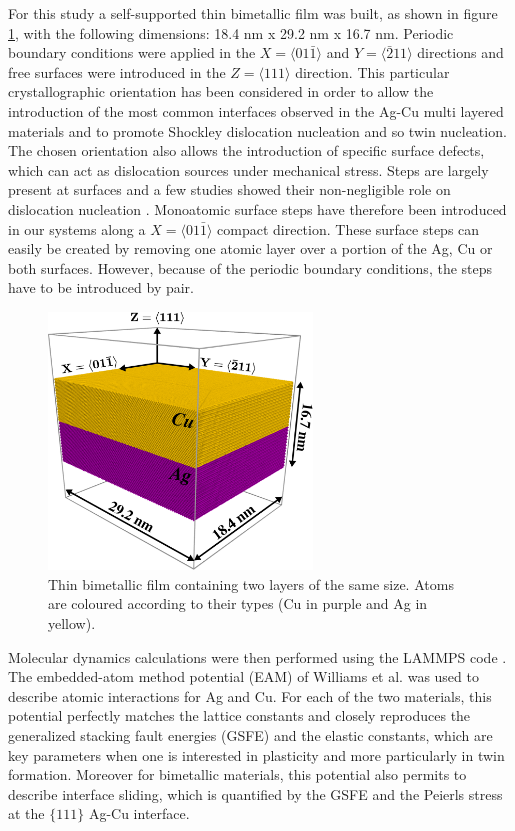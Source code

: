 \documentclass[final,3p,times,twocolumn]{elsarticle}
\begin{document}
For this study a self-supported thin bimetallic film was built, as shown in figure \ref{fig_mod_geo}, with the following dimensions: 18.4 nm x 29.2 nm x 16.7 nm. Periodic boundary conditions were applied in the $X=\langle01\bar{1}\rangle$ and $Y=\langle\bar{2}11\rangle$ directions and free surfaces were introduced in the $Z=\langle111\rangle$ direction. This particular crystallographic orientation has been considered in order to allow the introduction of the most common interfaces observed in the Ag-Cu multi layered materials and to promote Shockley dislocation nucleation and so twin nucleation. The chosen orientation also allows the introduction of specific surface defects, which can act as dislocation sources under mechanical stress. Steps are largely present at surfaces and a few studies showed their non-negligible role on dislocation nucleation \cite{brochard00PMA,hirel07SM,navarro08PRL}. Monoatomic surface steps have therefore been introduced in our systems along a $X=\langle01\bar{1}\rangle$ compact direction. These surface steps can easily be created by removing one atomic layer over a portion of the Ag, Cu or both surfaces. However, because of the periodic boundary conditions, the steps have to be introduced by pair. 
\begin{figure}[!h]
	\begin{center}
		\includegraphics[width=70mm]{Pic/mod_geo.eps} 
	\end{center}
	\caption{Thin bimetallic film containing two layers of the same size. Atoms are coloured according to their types (Cu in purple and Ag in yellow).}\label{fig_mod_geo}
\end{figure}

Molecular dynamics calculations were then performed using the LAMMPS code \cite{plimpton95JCP}. The embedded-atom method potential (EAM) of Williams et al. \cite{williams06MSMSE} was used to describe atomic interactions for Ag and Cu. For each of the two materials, this potential perfectly matches the lattice constants and closely reproduces the generalized stacking fault energies (GSFE) and the elastic constants, which are key parameters when one is interested in plasticity and more particularly in twin formation. Moreover for bimetallic materials, this potential also permits to describe interface sliding, which is quantified by the GSFE and the Peierls stress \cite{li15PM} at the $\lbrace111\rbrace$ Ag-Cu interface.
\end{document}
